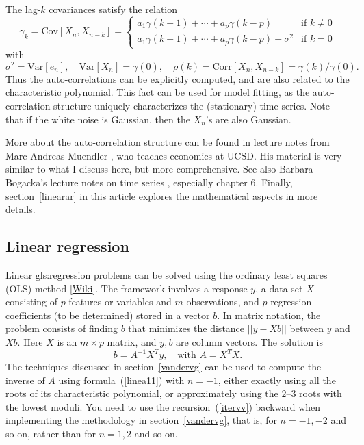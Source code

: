 \documentclass[oneside,10pt]{book}
\begin{document}
\noindent The lag-$k$ covariances satisfy the relation 
$$
\gamma_k=\text{Cov}[X_n,X_{n-k}]=\left\{
\begin{array}{ll}
a_1 \gamma(k-1)+\cdots + a_p\gamma(k-p) &   \text{if } k\neq 0 \\ [6pt]
a_1   \gamma(k-1)+\cdots + a_p\gamma(k-p) + \sigma^2 & \text{if } k= 0
\end{array}
\right.
$$
with
$$
\sigma^2=\text{Var}[e_n],\quad \text{Var}[X_n]=\gamma(0),\quad \rho(k)=\text{Corr}[X_n,X_{n-k}]=\gamma(k)/\gamma(0).
$$
\noindent Thus the auto-correlations can be explicitly computed, and are also related to the characteristic polynomial. This fact can be used for model fitting, as the auto-correlation structure uniquely characterizes the (stationary) time series. Note that if the white noise is Gaussian, then the $X_n$'s are also Gaussian. 

More about the auto-correlation structure can be found in lecture notes from Marc-Andreas Muendler \cite{mamu}, who teaches economics at UCSD. His material is very similar to what I discuss here, but more comprehensive. See also Barbara Bogacka's lecture notes on time series \cite{bbog}, especially chapter 6. Finally, section~\ref{linearar} in this article explores the mathematical aspects in more details.

\subsection{Linear regression}

Linear \gls{gls:regression} problems can be solved using the \textcolor{index}{ordinary least squares} (OLS) method [\href{https://en.wikipedia.org/wiki/Ordinary_least_squares}{Wiki}]. 
The framework involves a response $y$, a data set $X$ consisting of $p$ features or variables and $m$ observations, and $p$ regression coefficients (to be determined) stored in a vector $b$. In matrix notation, the problem consists of finding $b$ that minimizes 
the distance $||y - Xb||$ between $y$ and $Xb$. Here $X$ is an $m\times p$ matrix, and $y,b$ are column vectors. The solution is 
$$
b= A^{-1}X^T y, \quad \text{with } A = X^TX.
$$
The techniques discussed in section~\ref{vandervg} can be used to compute the inverse of $A$ using formula~(\ref{linea11}) with $n=-1$, either exactly using all the roots of its 
\textcolor{index}{characteristic polynomial}, or approximately using the $2$--$3$ roots with the lowest moduli. You need to use the recursion~(\ref{itervv}) backward when implementing the methodology in section~\ref{vandervg}, that is, for $n=-1,-2$ and so on, rather than for $n=1,2$ and so on.  
\end{document}
